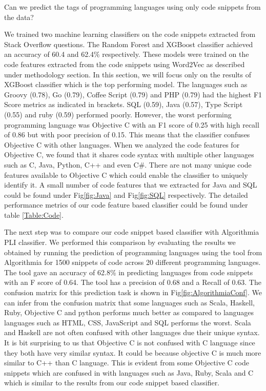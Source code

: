 \documentclass[letterpaper, 10 pt, conference]{ieeeconf}  %
\begin{document}
\begin{res}
Can we predict the tags of programming languages using only code snippets from the data?
\end{res}

We trained two machine learning classifiers on the code snippets extracted from Stack Overflow questions. The Random Forest and XGBoost classifier achieved an accuracy of 60.4 and 62.4\% respectively. These models were trained on the code features extracted from the code snippets using Word2Vec as described under methodology section. In this section, we will focus only on the results of XGBoost classifier which is the top performing model. The languages such as Groovy (0.78), Go (0.79), Coffee Script (0.79) and PHP (0.79) had the highest F1 Score metrics as indicated in brackets. SQL (0.59), Java (0.57), Type Script (0.55) and ruby (0.59) performed poorly. However, the worst performing programming language was Objective C with an F1 score of 0.25 with high recall of 0.86 but with poor precision of 0.15. This means that the classifier confuses Objective C with other languages. When we analyzed the code features for Objective C, we found that it shares code syntax with multiple other languages such as C, Java, Python, C++ and even C\#. There are not many unique code features available to Objective C which could enable the classifier to uniquely identify it. A small number of code features that we extracted for Java and SQL could be found under Fig\ref{fig:Java} and Fig\ref{fig:SQL} respectively.  The detailed performance metrics of our code feature based classifier could be found under table \ref{Table:Code}.



The next step was to compare our code snippet based classifier with Algorithmia PLI classifier. We performed this comparison by evaluating the results we obtained by running the prediction of programming languages using the tool from Algorithmia for 1500 snippets of code across 20 different programming languages. The tool gave an accuracy of 62.8\% in predicting languages from code snippets with an F score of 0.64. The tool has a precision of 0.68 and a Recall of 0.63. The confusion matrix for this prediction task is shown in Fig\ref{fig:AlgorithmiaConf}. We can infer from the confusion matrix that some languages such as Scala, Haskell, Ruby, Objective C and python performs much better as compared to languages languages such as HTML, CSS, JavaScript and SQL performs the worst. Scala and Haskell are not often confused with other languages due their unique syntax. It is bit surprising to us that Objective C is not confused with C language since they both have very similar syntax. It could be because objective C is much more similar to C++ than C language. This is evident from some Objective C code snippets which are confused in with languages such as Java, Ruby, Scala and C which is similar to the results from our code snippet based classifier.
 
\end{document}

